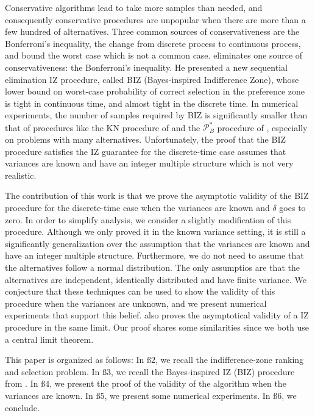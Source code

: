 \documentclass{wscpaperproc}
\theoremstyle{wsc}
\begin{document}
Conservative algorithms lead to take more samples than needed, and consequently conservative procedures are unpopular 
when there are more than a few hundred of alternatives. Three common sources of conservativeness are
 the Bonferroni's inequality, the change from discrete process to continuous process, and bound the worst case which is not a common case.
   eliminates one source of conservativeness: the Bonferroni's inequality. He presented  a new sequential elimination
IZ procedure, called BIZ (Bayes-inspired Indifference Zone), whose
lower bound on worst-case probability of correct selection in the
preference zone is tight in continuous time, and almost tight in the
discrete time. In numerical experiments, the number of samples required
by BIZ is significantly smaller than that of procedures like the KN procedure of  and
the $\mathcal{P}_{B}^{*}$ procedure of , 
especially on problems with many alternatives. Unfortunately, the
proof that the BIZ procedure satisfies the IZ guarantee for the discrete-time
case assumes that variances are known and have an integer multiple
structure which is not very realistic. 

The contribution of this work is that we prove the asymptotic validity of the 
BIZ procedure for the discrete-time case when the variances are known and $\delta$ goes to zero. 
In order to simplify analysis, we consider a slightly modification of this procedure.
Although we only proved it in the known variance setting, it is still a significantly
generalization over the assumption that the variances are known and have an integer multiple
structure. Furthermore, we do not need to assume that the alternatives follow a normal distribution. 
The only assumptios are that the alternatives are independent, identically distributed and have
finite variance. We conjecture that these techniques can be used to show the validity of this procedure when
the variances are unknown, and we present numerical experiments that support this belief. 
 also proves the asymptotical validity of a IZ procedure in the same limit.
Our proof shares some similarities since we both use a central limit theorem.



This paper is organized as follows: In $\text{ß}2$, we recall the
indifference-zone ranking and selection problem. In $\text{ß}3$,
we recall the Bayes-inspired IZ (BIZ) procedure from . In $\text{ß}4$,
we present the proof of the validity of the algorithm when the variances
are known. In $\text{ß}5$, we present some numerical experiments. 
In $\text{ß}6$, we conclude.
\end{document}
